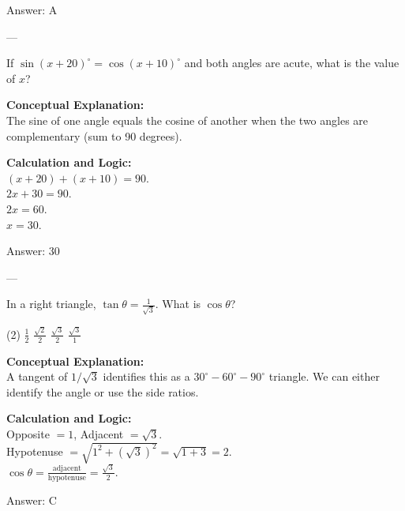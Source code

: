 \documentclass[11pt,paper=a4,answers]{exam}
\begin{document}
\begin{questions}
\begin{solution}
\vspace{15pt}
Answer: \colorbox{yellow!100}{A}
\end{solution}

---

\question
If $\sin(x + 20)^\circ = \cos(x + 10)^\circ$ and both angles are acute, what is the value of $x$?

\begin{solution}
\textbf{Conceptual Explanation:} \\
The sine of one angle equals the cosine of another when the two angles are complementary (sum to 90 degrees).

\vspace{10pt}
\textbf{Calculation and Logic:} \\
$(x + 20) + (x + 10) = 90$. \\
$2x + 30 = 90$. \\
$2x = 60$. \\
$x = 30$.

\vspace{15pt}
Answer: \colorbox{yellow!100}{30}
\end{solution}

---

\question
In a right triangle, $\tan \theta = \frac{1}{\sqrt{3}}$. What is $\cos \theta$?
\begin{tasks}(2)
    \task $\frac{1}{2}$
    \task $\frac{\sqrt{2}}{2}$
    \task $\frac{\sqrt{3}}{2}$
    \task $\frac{\sqrt{3}}{1}$
\end{tasks}

\begin{solution}
\textbf{Conceptual Explanation:} \\
A tangent of $1/\sqrt{3}$ identifies this as a $30^\circ-60^\circ-90^\circ$ triangle. We can either identify the angle or use the side ratios.

\vspace{10pt}
\textbf{Calculation and Logic:} \\
Opposite $= 1$, Adjacent $= \sqrt{3}$. \\
Hypotenuse $= \sqrt{1^2 + (\sqrt{3})^2} = \sqrt{1 + 3} = 2$. \\
$\cos \theta = \frac{\text{adjacent}}{\text{hypotenuse}} = \frac{\sqrt{3}}{2}$.

\vspace{15pt}
Answer: \colorbox{yellow!100}{C}
\end{solution}


\end{questions}
\end{document}
